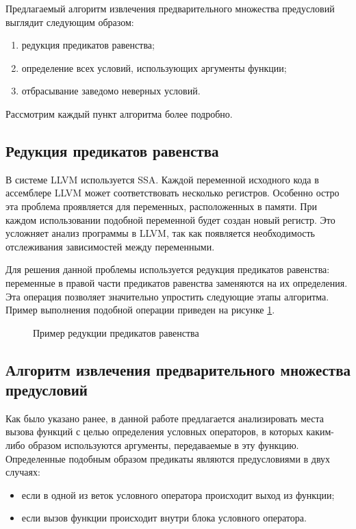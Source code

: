Предлагаемый алгоритм извлечения предварительного множества предусловий выглядит следующим образом:
\begin{enumerate}
\item редукция предикатов равенства;
\item определение всех условий, использующих аргументы функции;
\item отбрасывание заведомо неверных условий.
\end{enumerate}

Рассмотрим каждый пункт алгоритма более подробно.

\subsection{Редукция предикатов равенства}
\label{subsection:reduction}
В системе LLVM используется SSA. Каждой переменной исходного кода в ассемблере LLVM может соответствовать несколько регистров. Особенно остро эта проблема проявляется для переменных, расположенных  в памяти. При каждом использовании подобной переменной будет создан новый регистр. Это усложняет анализ программы в LLVM, так как появляется необходимость отслеживания зависимостей между переменными.

Для решения данной проблемы используется редукция предикатов равенства: переменные в правой части предикатов равенства заменяются на их определения. Эта операция позволяет значительно упростить следующие этапы алгоритма. Пример выполнения подобной операции приведен на рисунке \ref{image:equalityMapperExample}.
\begin{figure}[h!]
\caption{Пример редукции предикатов равенства}
\label{image:equalityMapperExample}
\end{figure}

\subsection{Алгоритм извлечения предварительного множества предусловий}
\label{subsection:extraction}
Как было указано ранее, в данной работе предлагается анализировать места вызова функций с целью определения условных операторов, в которых каким-либо образом используются аргументы, передаваемые в эту функцию. Определенные подобным образом предикаты являются предусловиями в двух случаях:
\begin{itemize}
\item если в одной из веток условного оператора происходит выход из функции;
\item если вызов функции происходит внутри блока условного оператора.
\end{itemize}

